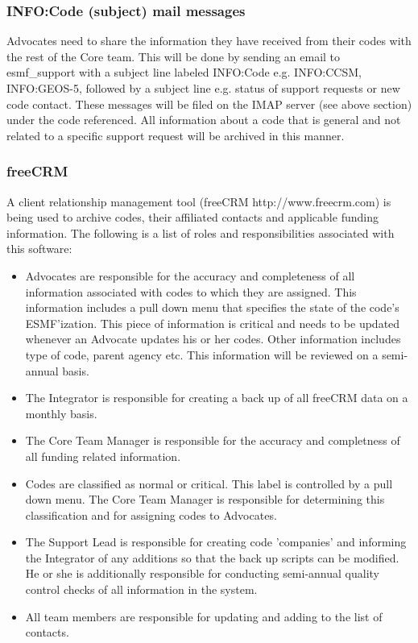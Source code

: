 \subsubsection{INFO:Code (subject) mail messages}
\label{infomail}

Advocates need to share the information they have received from their codes with the rest of the Core team. This will be done by sending an email to esmf\_support with a subject line labeled INFO:Code e.g. INFO:CCSM, INFO:GEOS-5, followed by a subject line e.g. status of support requests or new code contact.  These messages will be filed on the IMAP server (see above section) under the code referenced. All information about a code that is general and not related to a specific support request will be archived in this manner. 

\subsubsection{freeCRM}
A client relationship management tool (freeCRM http://www.freecrm.com) is being used 
to archive codes, their affiliated contacts and applicable funding information. The 
following is a list of roles and responsibilities associated with this software:
\begin{itemize}
\item Advocates are responsible for the accuracy and completeness of all information 
associated with codes to which they are assigned.  This information includes a pull 
down menu that specifies the state of the code's ESMF'ization. This piece of 
information is critical and needs to be updated whenever an Advocate updates his or 
her codes. Other information includes type of code, parent agency etc. This 
information will be reviewed on a semi-annual basis. 
\item The Integrator is responsible for creating a back up of all freeCRM data on a 
monthly basis.
\item The Core Team Manager is responsible for the accuracy and completness of all 
funding related information.
\item Codes are classified as normal or critical. This label is controlled by a pull 
down menu. The Core Team Manager is responsible for determining this classification 
and for assigning codes to Advocates.
\item The Support Lead is responsible for creating code 'companies' and informing 
the Integrator of any additions so that the back up scripts can be modified. He or 
she is additionally responsible for conducting semi-annual quality control checks of 
all information in the system. 
\item All team members are responsible for updating and adding to the list of 
contacts. 
\end{itemize} 


 
